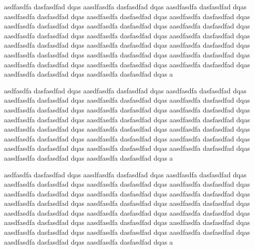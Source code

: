 \documentclass[a4paper,10pt]{article}
\begin{document}
  asdfasdfa dasfasdfad dqas aasdfasdfa dasfasdfad dqas aasdfasdfa dasfasdfad dqas aasdfasdfa dasfasdfad dqas aasdfasdfa dasfasdfad dqas aasdfasdfa dasfasdfad dqas aasdfasdfa dasfasdfad dqas aasdfasdfa dasfasdfad dqas aasdfasdfa dasfasdfad dqas aasdfasdfa dasfasdfad dqas aasdfasdfa dasfasdfad dqas aasdfasdfa dasfasdfad dqas aasdfasdfa dasfasdfad dqas aasdfasdfa dasfasdfad dqas aasdfasdfa dasfasdfad dqas aasdfasdfa dasfasdfad dqas aasdfasdfa dasfasdfad dqas aasdfasdfa dasfasdfad dqas aasdfasdfa dasfasdfad dqas aasdfasdfa dasfasdfad dqas aasdfasdfa dasfasdfad dqas aasdfasdfa dasfasdfad dqas aasdfasdfa dasfasdfad dqas a
  
  asdfasdfa dasfasdfad dqas aasdfasdfa dasfasdfad dqas aasdfasdfa dasfasdfad dqas aasdfasdfa dasfasdfad dqas aasdfasdfa dasfasdfad dqas aasdfasdfa dasfasdfad dqas aasdfasdfa dasfasdfad dqas aasdfasdfa dasfasdfad dqas aasdfasdfa dasfasdfad dqas aasdfasdfa dasfasdfad dqas aasdfasdfa dasfasdfad dqas aasdfasdfa dasfasdfad dqas aasdfasdfa dasfasdfad dqas aasdfasdfa dasfasdfad dqas aasdfasdfa dasfasdfad dqas aasdfasdfa dasfasdfad dqas aasdfasdfa dasfasdfad dqas aasdfasdfa dasfasdfad dqas aasdfasdfa dasfasdfad dqas aasdfasdfa dasfasdfad dqas aasdfasdfa dasfasdfad dqas aasdfasdfa dasfasdfad dqas aasdfasdfa dasfasdfad dqas a
  
  asdfasdfa dasfasdfad dqas aasdfasdfa dasfasdfad dqas aasdfasdfa dasfasdfad dqas aasdfasdfa dasfasdfad dqas aasdfasdfa dasfasdfad dqas aasdfasdfa dasfasdfad dqas aasdfasdfa dasfasdfad dqas aasdfasdfa dasfasdfad dqas aasdfasdfa dasfasdfad dqas aasdfasdfa dasfasdfad dqas aasdfasdfa dasfasdfad dqas aasdfasdfa dasfasdfad dqas aasdfasdfa dasfasdfad dqas aasdfasdfa dasfasdfad dqas aasdfasdfa dasfasdfad dqas aasdfasdfa dasfasdfad dqas aasdfasdfa dasfasdfad dqas aasdfasdfa dasfasdfad dqas aasdfasdfa dasfasdfad dqas aasdfasdfa dasfasdfad dqas aasdfasdfa dasfasdfad dqas aasdfasdfa dasfasdfad dqas aasdfasdfa dasfasdfad dqas a
\end{document}
